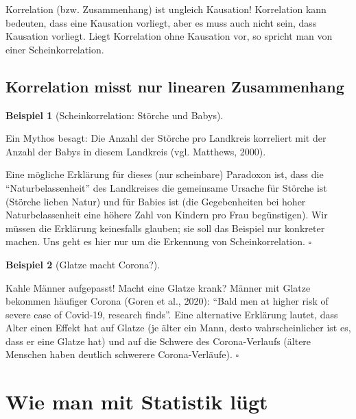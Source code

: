 \documentclass[
  letterpaper,
  twoside,
  open=any]{scrbook}
\theoremstyle{definition}
\theoremstyle{definition}
\newtheorem{example}{Beispiel}[chapter]
\theoremstyle{definition}
\theoremstyle{remark}
\begin{document}
Korrelation (bzw. Zusammenhang) ist ungleich Kausation! Korrelation kann
bedeuten, dass eine Kausation vorliegt, aber es muss auch nicht sein,
dass Kausation vorliegt. Liegt Korrelation ohne Kausation vor, so
spricht man von einer Scheinkorrelation.

\subsection{Korrelation misst nur linearen
Zusammenhang}\label{korrelation-misst-nur-linearen-zusammenhang}

\begin{example}[Scheinkorrelation: Störche und
Babys]\protect\hypertarget{exm-scheinkorr}{}\label{exm-scheinkorr}

Ein Mythos besagt: Die Anzahl der Störche pro Landkreis korreliert mit
der Anzahl der Babys in diesem Landkreis (vgl. Matthews, 2000).

Eine mögliche Erklärung für dieses (nur scheinbare) Paradoxon ist, dass
die \enquote{Naturbelassenheit} des Landkreises die gemeinsame Ursache
für Störche ist (Störche lieben Natur) und für Babies ist (die
Gegebenheiten bei hoher Naturbelassenheit eine höhere Zahl von Kindern
pro Frau begünstigen). Wir müssen die Erklärung keinesfalls glauben; sie
soll das Beispiel nur konkreter machen. Uns geht es hier nur um die
Erkennung von Scheinkorrelation. \(\square\)

\end{example}

\begin{example}[Glatze macht
Corona?]\protect\hypertarget{exm-corona-glatze}{}\label{exm-corona-glatze}

Kahle Männer aufgepasst! Macht eine Glatze krank? Männer mit Glatze
bekommen häufiger Corona (Goren et al., 2020): \enquote{Bald men at
higher risk of severe case of Covid-19, research finds}. Eine
alternative Erklärung lautet, dass Alter einen Effekt hat auf Glatze (je
älter ein Mann, desto wahrscheinlicher ist es, dass er eine Glatze hat)
und auf die Schwere des Corona-Verlaufs (ältere Menschen haben deutlich
schwerere Corona-Verläufe). \(\square\)

\end{example}

\section{Wie man mit Statistik
lügt}\label{wie-man-mit-statistik-luxfcgt-3}
\end{document}
